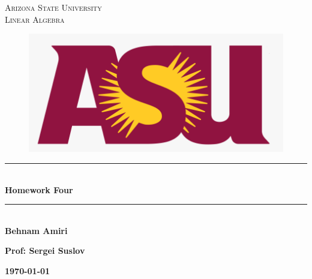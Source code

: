\documentclass[fleqn]{article}
\begin{document}
  \begin{titlepage}

    \newcommand{\HRule}{\rule{\linewidth}{0.5mm}}

    \center


    \textsc{\LARGE Arizona State University}\\[1.5cm]

    \textsc{\LARGE Linear Algebra }\\[1.5cm]


    \begin{figure}
      \includegraphics[width=\linewidth]{asu.png}
    \end{figure}


    \HRule \\[0.4cm]
    { \huge \bfseries Homework Four}\\[0.4cm] 
    \HRule \\[1.5cm]

    \textbf{Behnam Amiri}

    \bigbreak

    \textbf{Prof: Sergei Suslov}

    \bigbreak


    \textbf{{\large \today}\\[2cm]}

    \vfill

  \end{titlepage}
\end{document}
